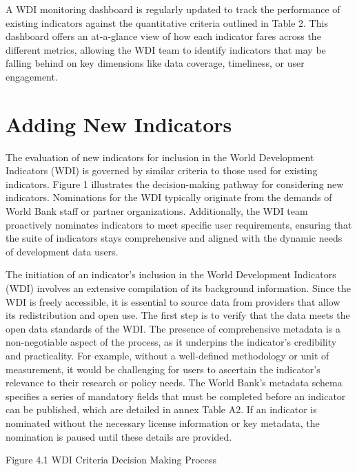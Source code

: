 \documentclass[
  11pt,
  a4paper,
  DIV=11,
  numbers=noendperiod]{scrreprt}
\begin{document}
A WDI monitoring dashboard is regularly updated to track the performance
of existing indicators against the quantitative criteria outlined in
Table 2. This dashboard offers an at-a-glance view of how each indicator
fares across the different metrics, allowing the WDI team to identify
indicators that may be falling behind on key dimensions like data
coverage, timeliness, or user engagement.


\chapter{Adding New Indicators}\label{adding-new-indicators}

The evaluation of new indicators for inclusion in the World Development
Indicators (WDI) is governed by similar criteria to those used for
existing indicators. Figure 1 illustrates the decision-making pathway
for considering new indicators. Nominations for the WDI typically
originate from the demands of World Bank staff or partner organizations.
Additionally, the WDI team proactively nominates indicators to meet
specific user requirements, ensuring that the suite of indicators stays
comprehensive and aligned with the dynamic needs of development data
users.

The initiation of an indicator's inclusion in the World Development
Indicators (WDI) involves an extensive compilation of its background
information. Since the WDI is freely accessible, it is essential to
source data from providers that allow its redistribution and open use.
The first step is to verify that the data meets the open data standards
of the WDI. The presence of comprehensive metadata is a non-negotiable
aspect of the process, as it underpins the indicator's credibility and
practicality. For example, without a well-defined methodology or unit of
measurement, it would be challenging for users to ascertain the
indicator's relevance to their research or policy needs. The World
Bank's metadata schema specifies a series of mandatory fields that must
be completed before an indicator can be published, which are detailed in
annex Table A2. If an indicator is nominated without the necessary
license information or key metadata, the nomination is paused until
these details are provided.

Figure 4.1 WDI Criteria Decision Making Process
\end{document}
